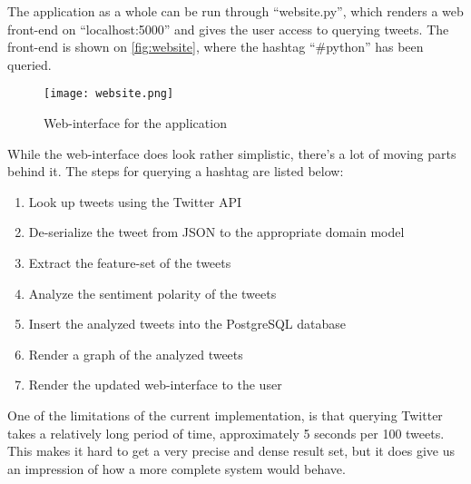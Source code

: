\documentclass[Main]{subfiles}
\begin{document}
The application as a whole can be run through ``website.py'', 
which renders a web front-end on ``localhost:5000'' and gives the user access to querying tweets.
The front-end is shown on \autoref{fig:website}, where the hashtag ``\#python'' has been queried.

\begin{figure}[h]
  \centering
  \texttt{[image: website.png]}
  \caption{Web-interface for the application}
  \label{fig:website}
\end{figure}

While the web-interface does look rather simplistic, there's a lot of moving parts behind it.
The steps for querying a hashtag are listed below:
\begin{enumerate}
\item Look up tweets using the Twitter API
\item De-serialize the tweet from JSON to the appropriate domain model
\item Extract the feature-set of the tweets
\item Analyze the sentiment polarity of the tweets
\item Insert the analyzed tweets into the PostgreSQL database
\item Render a graph of the analyzed tweets
\item Render the updated web-interface to the user
\end{enumerate}

One of the limitations of the current implementation, is that querying Twitter takes a relatively long period of time,
approximately 5 seconds per 100 tweets. 
This makes it hard to get a very precise and dense result set, but it does give us an impression of how a more complete system would behave.
\end{document}
